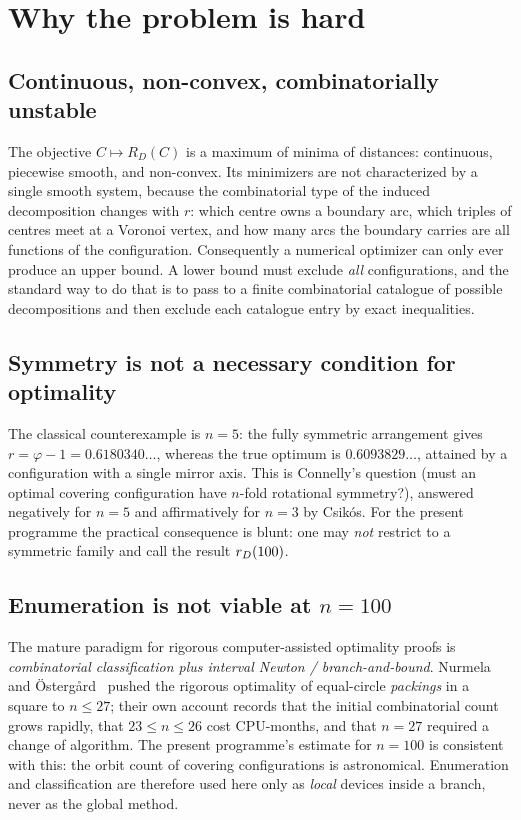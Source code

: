 \section{Why the problem is hard}

\subsection{Continuous, non-convex, combinatorially unstable}

The objective $C\mapsto R_D(C)$ is a maximum of minima of distances: continuous, piecewise smooth,
and non-convex. Its minimizers are not characterized by a single smooth system, because the
combinatorial type of the induced decomposition changes with $r$: which centre owns a boundary arc,
which triples of centres meet at a Voronoi vertex, and how many arcs the boundary carries are all
functions of the configuration. Consequently a numerical optimizer can only ever produce an upper
bound. A lower bound must exclude \emph{all} configurations, and the standard way to do that is to
pass to a finite combinatorial catalogue of possible decompositions and then exclude each catalogue
entry by exact inequalities.

\subsection{Symmetry is not a necessary condition for optimality}

The classical counterexample is $n=5$: the fully symmetric arrangement gives
$r=\varphi-1=0.6180340\ldots$, whereas the true optimum is $0.6093829\ldots$, attained by a
configuration with a single mirror axis. This is Connelly's question (must an optimal covering
configuration have $n$-fold rotational symmetry?), answered negatively for $n=5$ and affirmatively
for $n=3$ by Csik\'os. For the present programme the practical consequence is blunt: one may
\emph{not} restrict to a symmetric family and call the result $r_{D}(100)$.

\subsection{Enumeration is not viable at $n=100$}

The mature paradigm for rigorous computer-assisted optimality proofs is
\emph{combinatorial classification plus interval Newton / branch-and-bound}. Nurmela and
\"Osterg{\aa}rd~\cite{nurmela1999} pushed the rigorous optimality of equal-circle \emph{packings} in a square to
$n\le27$; their own account records that the initial combinatorial count grows rapidly, that
$23\le n\le26$ cost CPU-months, and that $n=27$ required a change of algorithm. The present
programme's estimate for $n=100$ is consistent with this: the orbit count of covering
configurations is astronomical. Enumeration and classification are therefore used here only as
\emph{local} devices inside a branch, never as the global method.

